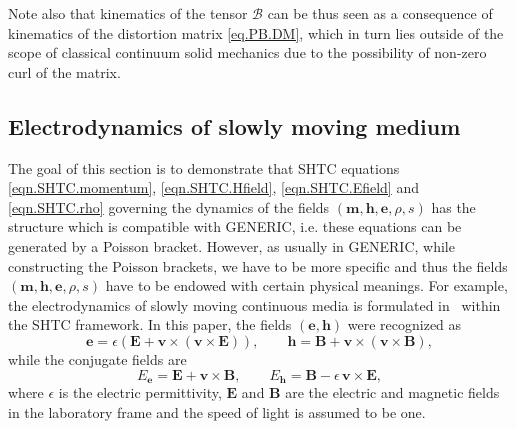 \documentclass[twoside]{article}
\newcommand{\vv}{{\boldsymbol{v}}}
\newcommand{\mm}{{\boldsymbol{m}}}
\newcommand{\ee}{{\boldsymbol{e}}}
\newcommand{\hh}{{\boldsymbol{h}}}
\newcommand{\EE}{{\boldsymbol{E}}}
\newcommand{\DD}{{\boldsymbol{D}}}
\newcommand{\BB}{{\boldsymbol{B}}}
\newcommand{\BBBB}{{\bm{\mathcal{B}}}}
\newcommand{\ted}{E} %
\newcommand{\dive}{\mathrm{div\,}}
\newcommand{\IP}[1]{ \textcolor{blue}   {\small\texttt{
\texttt{[image: pin\_small.jpeg]} Ilya: #1}} }
\newcommand{\MP}[1]{ \textcolor{Green}   {\small\texttt{
\texttt{[image: pin\_small.jpeg]} Michal: #1}} }
\begin{document}
Note also that kinematics of the tensor $\BBBB$ can be thus seen as a consequence 
of kinematics of the distortion matrix \eqref{eq.PB.DM}, which in turn lies 
outside of the scope of classical continuum solid mechanics due to the 
possibility of 
non-zero curl of the matrix.



\subsection{Electrodynamics of slowly moving medium}



The goal of this section is to demonstrate that SHTC equations 
\eqref{eqn.SHTC.momentum}, \eqref{eqn.SHTC.Hfield}, \eqref{eqn.SHTC.Efield} and 
\eqref{eqn.SHTC.rho} governing the dynamics of the fields $ 
(\mm,\hh,\ee,\rho,s) 
$ has the structure which is compatible with GENERIC, i.e. these equations 
can be generated by a Poisson bracket. However, as usually in GENERIC, while 
constructing the Poisson brackets, we have to be more specific and thus the 
fields $ (\mm,\hh,\ee,\rho,s) $ have to be endowed with certain physical 
meanings.  
For example, the electrodynamics of slowly moving continuous media is 
formulated in~\cite{DPRZ2017} within the SHTC framework. In this paper, the 
fields $ (\ee,\hh) $ were recognized as
\begin{equation}\label{eqn.elmag.eh}
\ee = \epsilon (\EE + \vv\times(\vv\times \EE)), \qquad
\hh = \BB + \vv\times(\vv\times \BB),
\end{equation}
while the conjugate fields are
\begin{equation}\label{eqn.elmag.db}
\ted_\ee = \EE + \vv\times\BB, \qquad \ted_\hh = \BB - \epsilon\, 
\vv\times\EE,
\end{equation}
where $ \epsilon $ is the electric permittivity, $ \EE $ and $ \BB $ are the 
electric and magnetic fields in the 
laboratory frame and the speed of light is assumed to be one.
\end{document}
